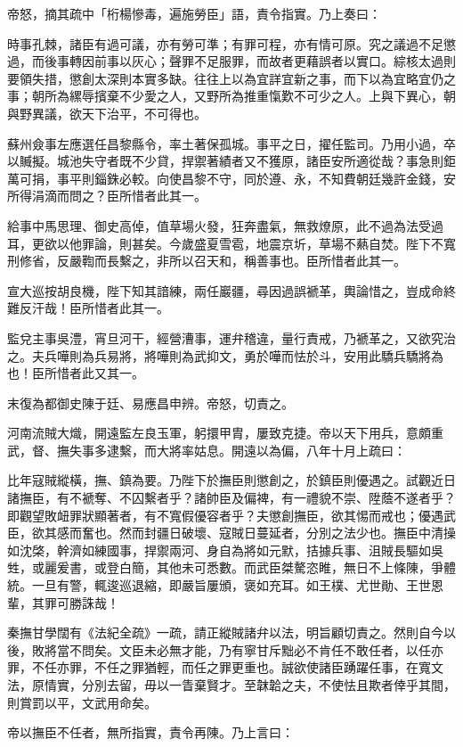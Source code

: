 \begin{pinyinscope}
帝怒，摘其疏中「桁楊慘毒，遍施勞臣」語，責令指實。乃上奏曰：

時事孔棘，諸臣有過可議，亦有勞可準；有罪可程，亦有情可原。究之議過不足懲過，而後事轉因前事以灰心；聲罪不足服罪，而故者更藉誤者以實口。綜核太過則要領失措，懲創太深則本實多缺。往往上以為宜詳宜新之事，而下以為宜略宜仍之事；朝所為縲辱擯棄不少愛之人，又野所為推重愾歎不可少之人。上與下異心，朝與野異議，欲天下治平，不可得也。

蘇州僉事左應選任昌黎縣令，率土著保孤城。事平之日，擢任監司。乃用小過，卒以贓擬。城池失守者既不少貸，捍禦著績者又不獲原，諸臣安所適從哉？事急則鉅萬可捐，事平則錙銖必較。向使昌黎不守，同於遵、永，不知費朝廷幾許金錢，安所得涓滴而問之？臣所惜者此其一。

給事中馬思理、御史高倬，值草場火發，狂奔盡氣，無救燎原，此不過為法受過耳，更欲以他罪論，則甚矣。今歲盛夏雪雹，地震京圻，草場不爇自焚。陛下不寬刑修省，反嚴鞫而長繫之，非所以召天和，稱善事也。臣所惜者此其一。

宣大巡按胡良機，陛下知其諳練，兩任巖疆，尋因過誤褫革，輿論惜之，豈成命終難反汗哉！臣所惜者此其一。

監兌主事吳澧，宵旦河干，經營漕事，運弁稽違，量行責戒，乃褫革之，又欲究治之。夫兵嘩則為兵易將，將嘩則為武抑文，勇於嘩而怯於斗，安用此驕兵驕將為也！臣所惜者此又其一。

末復為都御史陳于廷、易應昌申辨。帝怒，切責之。

河南流賊大熾，開遠監左良玉軍，躬擐甲胄，屢致克捷。帝以天下用兵，意頗重武，督、撫失事多逮繫，而大將率姑息。開遠以為偏，八年十月上疏曰：

比年寇賊縱橫，撫、鎮為要。乃陛下於撫臣則懲創之，於鎮臣則優遇之。試觀近日諸撫臣，有不褫奪、不囚繫者乎？諸帥臣及偏裨，有一禮貌不崇、陞蔭不遂者乎？即觀望敗衄罪狀顯著者，有不寬假優容者乎？夫懲創撫臣，欲其惕而戒也；優遇武臣，欲其感而奮也。然而封疆日破壞、寇賊日蔓延者，分別之法少也。撫臣中清操如沈棨，幹濟如練國事，捍禦兩河、身自為將如元默，拮據兵事、沮賊長驅如吳甡，或麗爰書，或登白簡，其他未可悉數。而武臣桀驁恣睢，無日不上條陳，爭體統。一旦有警，輒逡巡退縮，即嚴旨屢頒，褒如充耳。如王樸、尤世勛、王世恩輩，其罪可勝誅哉！

秦撫甘學闊有《法紀全疏》一疏，請正縱賊諸弁以法，明旨顧切責之。然則自今以後，敗將當不問矣。文臣未必無才能，乃有寧甘斥黜必不肯任不敢任者，以任亦罪，不任亦罪，不任之罪猶輕，而任之罪更重也。誠欲使諸臣踴躍任事，在寬文法，原情實，分別去留，毋以一眚棄賢才。至韎韐之夫，不使怯且欺者倖乎其間，則賞罰以平，文武用命矣。

帝以撫臣不任者，無所指實，責令再陳。乃上言曰：


\end{pinyinscope}
